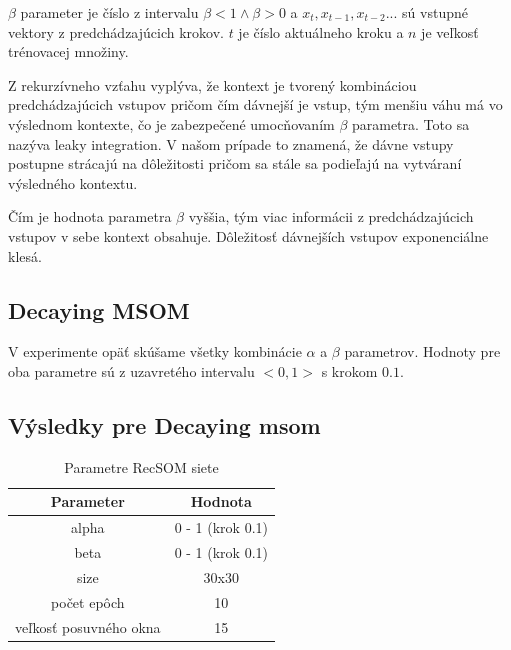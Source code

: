 $\beta$ parameter je číslo z intervalu $\beta < 1 \wedge \beta > 0$ a
$x_t, x_{t-1}, x_{t-2} ...$ sú vstupné vektory z predchádzajúcich krokov.
$t$ je číslo aktuálneho kroku a $n$ je veľkosť trénovacej množiny.

Z rekurzívneho vzťahu vyplýva, že kontext je tvorený kombináciou predchádzajúcich vstupov
pričom čím dávnejší je vstup, tým menšiu váhu má vo výslednom kontexte, čo je zabezpečené umocňovaním
$\beta$ parametra. Toto sa nazýva leaky integration. V našom prípade
to znamená, že dávne vstupy postupne strácajú na dôležitosti pričom sa stále sa podieľajú 
na vytváraní výsledného kontextu.

Čím je hodnota parametra $\beta$ vyššia, tým viac informácii z predchádzajúcich vstupov v sebe
kontext obsahuje. Dôležitosť dávnejších vstupov exponenciálne klesá.

\subsection{Decaying MSOM}
V experimente opäť skúšame všetky kombinácie $\alpha$ a $\beta$ parametrov.
Hodnoty pre oba parametre sú z uzavretého intervalu $<0, 1>$ s krokom $0.1$.

\subsection{Výsledky pre Decaying msom}
\begin{table}[h!]
    \centering
    \begin{tabular}{|c|c|} 
     \hline
     Parameter & Hodnota \\ 
     \hline\hline
     alpha & 0 - 1 (krok 0.1)  \\ 
     \hline
     beta & 0 - 1  (krok 0.1) \\ 
     \hline
     size & 30x30  \\
     \hline
     počet epôch & 10  \\
     \hline
     veľkosť posuvného okna & 15 \\
     \hline
    \end{tabular}
    \caption{Parametre RecSOM siete}
    \label{table:1}
    \end{table}
    
